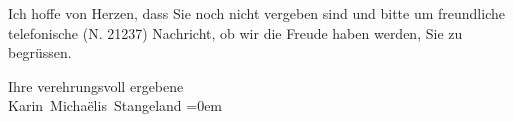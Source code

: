 \pstart
           {\pb}Ich hoffe von Herzen, dass Sie noch nicht vergeben sind
               und bitte um freundliche telefonische (N. 21237)  Nachricht, ob wir die Freude haben werden, Sie zu begrüssen.\pend
           
\pstart
           Ihre verehrungsvoll ergebene{\\[\baselineskip]}\spacefill\mbox{Karin Michaëlis Stangeland}\pend
           \leftskip=0em{}\endnumbering{}  \newcommand{\dateiname}{L02582}\newcommand{\titel}{Karin Michaëlis an Arthur Schnitzler, 21. 10. 1912}\newcommand{\editorInnen}{Martin Anton Müller und Laura Untner}
